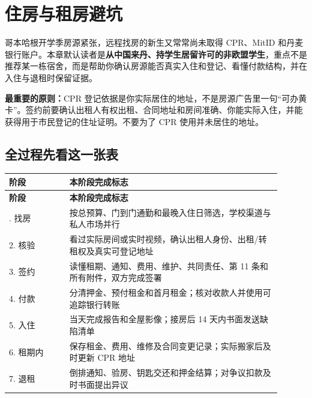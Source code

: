 
\section{住房与租房避坑}\label{sec:housing}

哥本哈根开学季房源紧张，远程找房的新生又常常尚未取得 CPR、MitID 和丹麦银行账户。本章默认读者是\textbf{从中国来丹、持学生居留许可的非欧盟学生}，重点不是推荐某一栋宿舍，而是帮助你确认房源能否真实入住和登记、看懂付款结构，并在入住与退租时保留证据。

\begin{grayleftbox}
\textbf{最重要的原则：}CPR 登记依据是你实际居住的地址，不是房源广告里一句“可办黄卡”。签约前要确认出租人有权出租、合同地址和房间准确、你能实际入住，并能获得用于市民登记的住址证明。不要为了 CPR 使用并未居住的地址。
\end{grayleftbox}

\subsection{全过程先看这一张表}

\small
{}
\begin{longtable}{p{0.20\linewidth}p{0.70\linewidth}}
  \toprule
  \textbf{阶段} & \textbf{本阶段完成标志} \\
  \midrule
  \endfirsthead
  \toprule
  \textbf{阶段} & \textbf{本阶段完成标志} \\
  \midrule
  \endhead
  \bottomrule
  \endfoot
  1. 找房 & 按总预算、门到门通勤和最晚入住日筛选，学校渠道与私人市场并行 \\
  2. 核验 & 看过实际房间或实时视频，确认出租人身份、出租/转租权及真实可登记地址 \\
  3. 签约 & 读懂租期、通知、费用、维护、共同责任、第 11 条和所有附件，双方完成签署 \\
  4. 付款 & 分清押金、预付租金和首月租金；核对收款人并使用可追踪银行转账 \\
  5. 入住 & 当天完成报告和全屋影像；接房后 14 天内书面发送缺陷清单 \\
  6. 租期内 & 保存租金、费用、维修及合同变更记录；实际搬家后及时更新 CPR 地址 \\
  7. 退租 & 倒排通知、验房、钥匙交还和押金结算；对争议扣款及时书面提出异议 \\
\end{longtable}
\normalsize

